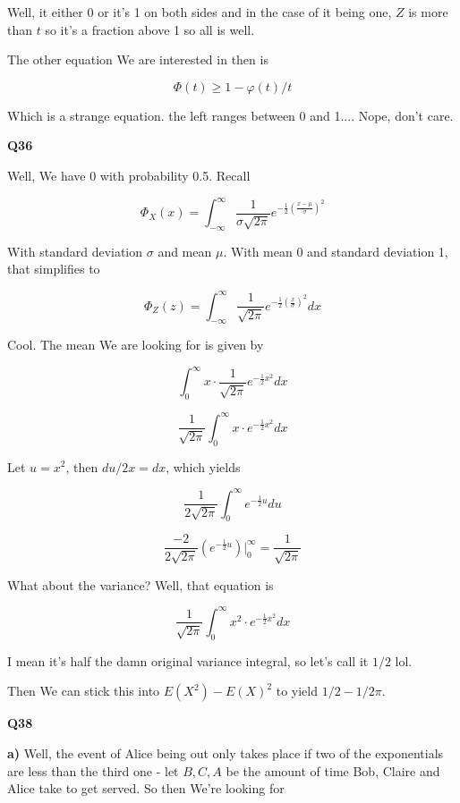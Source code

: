 \documentclass{article}
\begin{document}
			Well, it either 0 or it's 1 on both sides and in the case of it being one, $Z$ is more than $t$ so it's a fraction above 1 so all is well.
			
			The other equation We are interested in then is 
			
			\[ \Phi(t) \ge 1 - \varphi(t)/t  \] 
		
			Which is a strange equation. the left ranges between 0 and 1.... Nope, don't care.
			
			\hfill
			
		\textbf{Q36}
		
			Well, We have 0 with probability 0.5. Recall
			
			\[ \Phi_X(x) = \int_{-\infty}^{\infty} \frac{1}{\sigma\sqrt{2\pi}}e^{-\frac{1}{2}\left(\frac{x-\mu}{\sigma}\right)^2}  \]		
		
			With standard deviation $\sigma$ and mean $\mu$. With mean 0 and standard deviation 1, that simplifies to
		
			\[ \Phi_Z(z) = \int_{-\infty}^{\infty} \frac{1}{\sqrt{2\pi}}e^{-\frac{1}{2}\left(\frac{x}{\sigma}\right)^2} dx  \]		
		
			Cool. The mean We are looking for is given by 	
			
			\[  \int_{0}^{\infty} x\cdot \frac{1}{\sqrt{2\pi}}e^{-\frac{1}{2}x^2} dx  \]		
			
			\[  \frac{1}{\sqrt{2\pi}}\int_{0}^{\infty} x\cdot e^{-\frac{1}{2}x^2} dx  \]		
			
			Let $u = x^2$, then $du/2x = dx$, which yields
			
			\[  \frac{1}{2\sqrt{2\pi}}\int_{0}^{\infty}  e^{-\frac{1}{2}u} du  \]		
			
			\[  \frac{-2}{2\sqrt{2\pi}} \left(  e^{-\frac{1}{2}u} \right)\bigg|^\infty_0 = \frac{1}{\sqrt{2\pi}}  \]		
			
			What about the variance? Well, that equation is
			
			\[  \frac{1}{\sqrt{2\pi}}\int_{0}^{\infty} x^2\cdot e^{-\frac{1}{2}x^2} dx  \]		
			
			I mean it's half the damn original variance integral, so let's call it $1/2$ lol.
			
			Then We can stick this into $E(X^2) - E(X)^2$ to yield $1/2 - 1/2\pi$.
			
			\hfill
			
		\textbf{Q38}
		
			\textbf{a)} Well, the event of Alice being out only takes place if two of the exponentials are less than the third one - let $B, C, A$ be the amount of time Bob, Claire and Alice take to get served. 
			So then We're looking for 
			
\end{document}
